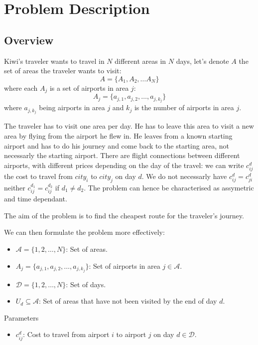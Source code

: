 \chapter{Problem Description}
\label{Chapter3}

\section{Overview}

Kiwi's traveler wants to travel in $N$ different areas in $N$ days, let's denote $A$ the set of areas the traveler wants to visit: \[A=\{A_{1}, A_{2}, \ldots A_{{N}}\}\]
where each \(A_{j}\) is a set of airports in area \(j\):
\[
A_{j} = \{ a_{j,1}, a_{j,2}, \ldots, a_{j,k_j} \}
\]
where \( a_{j,k_j} \) being airports in area \(j\) and \(k_j\) is the number of airports in area \(j\).

The traveler has to visit one area per day. He has to leave this area to visit a new area by flying from the airport he flew in.
He leaves from a known starting airport and has to do his journey and come back to the starting area, not necessarly the starting airport. 
There are flight connections between different airports, with different prices depending on the day of the travel:
we can write $c^{d}_{ij}$ the cost to travel from $city_i$ to $city_j$ on day $d$. We do not necessarly have $c^{d}_{ij}=c^{d}_{ji}$ neither $c^{d_1}_{ij}=c^{d_2}_{ij}$ if $d_1 \neq d_2$. The problem can hence be characterised as assymetric and time dependant.

The aim of the problem is to find the cheapest route for the traveler's journey.

We can then formulate the problem more effectively:

\begin{itemize}
    \item $\mathcal{A} = \{1, 2, \ldots, N\}$: Set of areas.
    \item $A_j = \{a_{j,1}, a_{j,2}, \ldots, a_{j,k_j}\}$: Set of airports in area $j \in \mathcal{A}$.
    \item $\mathcal{D} = \{1, 2, \ldots, N\}$: Set of days.
    \item $U_d \subseteq \mathcal{A}$: Set of areas that have not been visited by the end of day $d$.
\end{itemize}

Parameters
\begin{itemize}
    \item $c_{ij}^d$: Cost to travel from airport $i$ to airport $j$ on day $d \in \mathcal{D}$.
\end{itemize}

